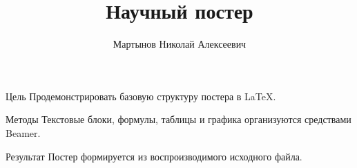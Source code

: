 \documentclass{beamer}
\title{Научный постер}
\author{Мартынов Николай Алексеевич}
\begin{document}
\begin{frame}[t]
  \begin{block}{Цель}
    Продемонстрировать базовую структуру постера в LaTeX.
  \end{block}
  \begin{block}{Методы}
    Текстовые блоки, формулы, таблицы и графика организуются средствами Beamer.
  \end{block}
  \begin{block}{Результат}
    Постер формируется из воспроизводимого исходного файла.
  \end{block}
\end{frame}
\end{document}
